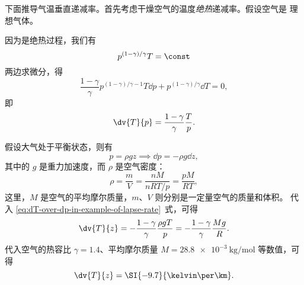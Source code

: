 \begin{example}[海拔与气温的关系]
  下面推导气温垂直递减率。首先考虑干燥空气的温度\emph{绝热}递减率。假设空气是
  理想气体。

  因为是绝热过程，我们有
  \begin{equation}
    p^{(1-\gamma) / \gamma} T = \const
  \end{equation}
  两边求微分，得
  \begin{equation}
    \frac{1-\gamma}{\gamma} p^{(1-\gamma)/\gamma-1} T \dd{p}
    + p^{(1-\gamma)/\gamma} \dd{T} = 0,
  \end{equation}
  即
  \begin{equation} \label{eq:dT-over-dp-in-example-of-lapse-rate}
    \dv{T}{p} = \frac{1-\gamma}{\gamma} \frac{T}{p}.
  \end{equation}

  假设大气处于平衡状态，则有
  \begin{equation}
    p = \rho gz \implies \dd{p} = -\rho g \dd{z},
  \end{equation}
  其中的 $g$ 是重力加速度，而 $\rho$ 是空气密度：
  \begin{equation}
    \rho = \frac{m}{V} = \frac{nM}{nRT/p} = \frac{pM}{RT},
  \end{equation}
  这里，$M$ 是空气的平均摩尔质量，$m$、$V$ 则分别是一定量空气的质量和体积。
  代入 \eqref{eq:dT-over-dp-in-example-of-lapse-rate}~式，可得
  \begin{equation}
    \dv{T}{z} = -\frac{1-\gamma}{\gamma} \frac{\rho gT}{p}
    = -\frac{1-\gamma}{\gamma} \frac{Mg}{R}.
  \end{equation}
  代入空气的热容比 $\gamma=1.4$、平均摩尔质量 $M=\SI{28.8e-3}{\kg\per\mol}$
  等数值，可得
  \begin{equation}
    \dv{T}{z} = \SI{-9.7}{\kelvin\per\km}.
  \end{equation}


\end{example}
